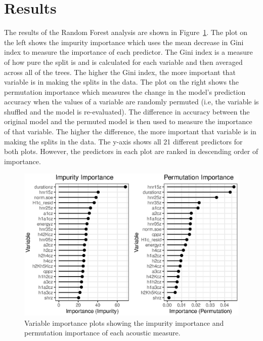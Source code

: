 \section{Results} \label{sec:dt_results}

The results of the Random Forest analysis are shown in Figure~\ref{fig:predictor_importance}. The plot on the left shows the impurity importance which uses the mean decrease in Gini index to measure the importance of each predictor. The Gini index is a measure of how pure the split is and is calculated for each variable and then averaged across all of the trees. The higher the Gini index, the more important that variable is in making the splits in the data. The plot on the right shows the permutation importance which measures the change in the model's prediction accuracy when the values of a variable are randomly permuted (i.e, the variable is shuffled and the model is re-evaluated). The difference in accuracy between the original model and the permuted model is then used to measure the importance of that variable. The higher the difference, the more important that variable is in making the splits in the data. The y-axis shows all 21 different predictors for both plots. However, the predictors in each plot are ranked in descending order of importance. 

\begin{figure}[h!]
    \centering
    \includegraphics[width = \linewidth]{images/RandomForest/rf_dur_plots.eps}
    \caption{Variable importance plots showing the impurity importance and permutation importance of each acoustic measure.}
    \label{fig:predictor_importance}
\end{figure}


